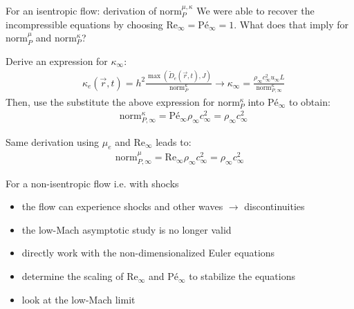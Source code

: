 \documentclass[xcolor=dvipsnames,10pt]{beamer}
\renewcommand{\Re}{\textrm{Re}}
\newcommand{\Pe}{\textrm{P\'e}}
\newcommand{\norm}{\textrm{norm}}
\begin{document}
\begin{frame}{For an isentropic flow: derivation of $\norm_P^{\mu, \kappa}$ }
We were able to recover the incompressible equations by choosing $\Re_\infty = \Pe_\infty = 1$. What does that imply for $\norm_P^\mu$ and $\norm_P^\kappa$?
\begin{block}{}
Derive an expression for $\kappa_\infty$:
\begin{align}
&\kappa_e(\vec{r},t) = h^2 \frac{\max \left( \tilde{D}_e(\vec{r},t), J \right)}{\norm_P^\kappa} \longrightarrow \kappa_\infty = \frac{ \rho_\infty c_\infty^2 u_\infty L }{ \norm_{P,\infty}^\kappa } \nonumber 
\end{align}
Then, use the substitute the above expression for $\norm_P^\kappa$ into $\Pe_\infty$ to obtain:
\begin{align}
&\norm_{P,\infty}^{\kappa} = \Pe_\infty \rho_\infty c_\infty^2 = \rho_\infty c_\infty^2 \nonumber
\end{align}
\end{block}
\begin{block}{}
Same derivation using $\mu_e$ and $\Re_\infty$ leads to:
\begin{align}
\norm_{P,\infty}^{\mu} = \Re_\infty \rho_\infty c_\infty^2 = \rho_\infty c_\infty^2 \nonumber
\end{align}
\end{block}
\end{frame}
\begin{frame}{For a non-isentropic flow i.e. with shocks}
\begin{block}{}
\begin{itemize}
\setlength{\itemsep}{10pt}
\item the flow can experience shocks and other waves $\to$ discontinuities
\item the low-Mach asymptotic study is no longer valid
\item directly work with the non-dimensionalized Euler equations
\item determine the scaling of $\Re_\infty$ and $\Pe_\infty$ to stabilize the equations
\item look at the low-Mach limit
\end{itemize}
\end{block}
\end{frame}
\end{document}
